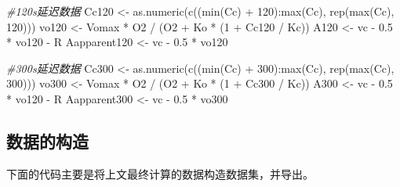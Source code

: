 \documentclass[
]{krantz}
\makeatletter
\newenvironment{Shaded}{\begin{snugshade}}{\end{snugshade}}
\newcommand{\CommentTok}[1]{\textcolor[rgb]{0.56,0.35,0.01}{\textit{#1}}}
\newcommand{\DecValTok}[1]{\textcolor[rgb]{0.00,0.00,0.81}{#1}}
\newcommand{\FloatTok}[1]{\textcolor[rgb]{0.00,0.00,0.81}{#1}}
\newcommand{\FunctionTok}[1]{\textcolor[rgb]{0.00,0.00,0.00}{#1}}
\newcommand{\NormalTok}[1]{#1}
\newcommand{\OtherTok}[1]{\textcolor[rgb]{0.56,0.35,0.01}{#1}}
\newcommand{\SpecialCharTok}[1]{\textcolor[rgb]{0.00,0.00,0.00}{#1}}
\newenvironment{kframe}{%
\medskip{}
\setlength{\fboxsep}{.8em}
 \def\at@end@of@kframe{}%
 \ifinner\ifhmode%
  \def\at@end@of@kframe{\end{minipage}}%
  \begin{minipage}{\columnwidth}%
 \fi\fi%
 \def\FrameCommand##1{\hskip\@totalleftmargin \hskip-\fboxsep
 \colorbox{shadecolor}{##1}\hskip-\fboxsep
     \hskip-\linewidth \hskip-\@totalleftmargin \hskip\columnwidth}%
 \MakeFramed {\advance\hsize-\width
   \@totalleftmargin\z@ \linewidth\hsize
   \@setminipage}}%
 {\par\unskip\endMakeFramed%
 \at@end@of@kframe}
\renewenvironment{Shaded}{\begin{kframe}}{\end{kframe}}
\makeatother
\begin{document}
\begin{Shaded}
\begin{Highlighting}[]
\CommentTok{\#120s延迟数据}
\NormalTok{Cc120 }\OtherTok{\textless{}{-}} \FunctionTok{as.numeric}\NormalTok{(}\FunctionTok{c}\NormalTok{((}\FunctionTok{min}\NormalTok{(Cc) }\SpecialCharTok{+} \DecValTok{120}\NormalTok{)}\SpecialCharTok{:}\FunctionTok{max}\NormalTok{(Cc), }\FunctionTok{rep}\NormalTok{(}\FunctionTok{max}\NormalTok{(Cc), }\DecValTok{120}\NormalTok{)))}
\NormalTok{vo120 }\OtherTok{\textless{}{-}}\NormalTok{ Vomax }\SpecialCharTok{*}\NormalTok{ O2 }\SpecialCharTok{/}\NormalTok{ (O2 }\SpecialCharTok{+}\NormalTok{ Ko }\SpecialCharTok{*}\NormalTok{ (}\DecValTok{1} \SpecialCharTok{+}\NormalTok{ Cc120 }\SpecialCharTok{/}\NormalTok{ Kc))}
\NormalTok{A120 }\OtherTok{\textless{}{-}}\NormalTok{ vc }\SpecialCharTok{{-}} \FloatTok{0.5} \SpecialCharTok{*}\NormalTok{ vo120 }\SpecialCharTok{{-}}\NormalTok{ R}
\NormalTok{Aapparent120 }\OtherTok{\textless{}{-}}\NormalTok{ vc }\SpecialCharTok{{-}} \FloatTok{0.5} \SpecialCharTok{*}\NormalTok{ vo120}

\CommentTok{\#300s延迟数据}
\NormalTok{Cc300 }\OtherTok{\textless{}{-}} \FunctionTok{as.numeric}\NormalTok{(}\FunctionTok{c}\NormalTok{((}\FunctionTok{min}\NormalTok{(Cc) }\SpecialCharTok{+} \DecValTok{300}\NormalTok{)}\SpecialCharTok{:}\FunctionTok{max}\NormalTok{(Cc), }\FunctionTok{rep}\NormalTok{(}\FunctionTok{max}\NormalTok{(Cc), }\DecValTok{300}\NormalTok{)))}
\NormalTok{vo300 }\OtherTok{\textless{}{-}}\NormalTok{ Vomax }\SpecialCharTok{*}\NormalTok{ O2 }\SpecialCharTok{/}\NormalTok{ (O2 }\SpecialCharTok{+}\NormalTok{ Ko }\SpecialCharTok{*}\NormalTok{ (}\DecValTok{1} \SpecialCharTok{+}\NormalTok{ Cc300 }\SpecialCharTok{/}\NormalTok{ Kc))}
\NormalTok{A300 }\OtherTok{\textless{}{-}}\NormalTok{ vc }\SpecialCharTok{{-}} \FloatTok{0.5} \SpecialCharTok{*}\NormalTok{ vo120 }\SpecialCharTok{{-}}\NormalTok{ R}
\NormalTok{Aapparent300 }\OtherTok{\textless{}{-}}\NormalTok{ vc }\SpecialCharTok{{-}} \FloatTok{0.5} \SpecialCharTok{*}\NormalTok{ vo300 }
\end{Highlighting}
\end{Shaded}

\hypertarget{multi4}{%
\subsection{数据的构造}\label{multi4}}

下面的代码主要是将上文最终计算的数据构造数据集，并导出。
\end{document}
